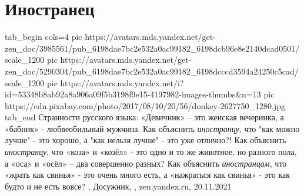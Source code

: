  
 
 
 
 
\chapter{Иностранец}
\label{sec:slova.inostranec}


\ifcmt
  tab_begin cols=4
     pic https://avatars.mds.yandex.net/get-zen_doc/3985561/pub_6198dae7bc2e532a0ac99182_6198dcb96e8e2140dcad0501/scale_1200
     pic https://avatars.mds.yandex.net/get-zen_doc/5290304/pub_6198dae7bc2e532a0ac99182_6198dcccd3594a24250c5cad/scale_1200
		 pic https://avatars.mds.yandex.net/i?id=53348b8ab92a8a906a09f5b3198f9e15-4197982-images-thumbs&n=13
		 pic https://cdn.pixabay.com/photo/2017/08/10/20/56/donkey-2627750_1280.jpg
  tab_end
\fi
Странности русского языка: «Девичник» – это женская вечеринка, а «бабник» -
любвеобильный мужчина.  Как объяснить \emph{иностранцу}, что "как можно лучше"
- это хорошо, а "как нельзя лучше" - это уже отлично?!  Как объяснить
\emph{иностранцу}, что «коза» и «козёл» - это одно и то же животное, но разного
пола, а «оса» и «осёл» – два совершенно разных?  Как объяснить
\emph{иностранцам}, что «жрать как свинья» - это очень много есть, а «нажраться
как свинья» - это как будто и не есть вовсе?
, Досужник, %
, zen.yandex.ru, 20.11.2021
